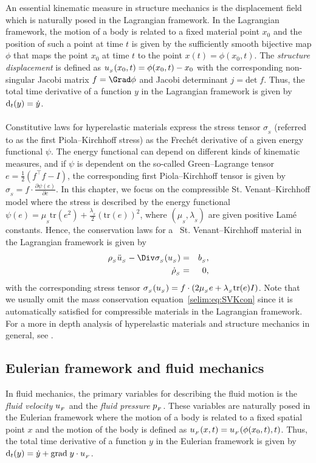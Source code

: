 An essential kinematic measure in structure mechanics is the
displacement field which is naturally posed in the Lagrangian
framework.  In the Lagrangian framework, the motion of a body is
related to a fixed material point $x_0$ and the position of
such a point at time $t$ is given by the sufficiently smooth bijective
map $\phi$ that maps the point $x_0$ at time $t$ to the point $x(t)=
\phi(x_0,t)$. The \emph{structure displacement} is defined as
$u_{_{S}}(x_0,t) = \phi(x_0, t) - x_0$ with the corresponding non-singular
Jacobi matrix $f = \Grad\phi$ and Jacobi determinant $j =
\textrm{det}\; f$. Thus, the total time derivative of a function $y$
in the Lagrangian framework is given by $\textrm{d}_t(y) = \dot{y}$.
\\\\
Constitutive laws for hyperelastic materials express the stress
tensor $\sigma_{_{S}}$ (referred to as the first Piola--Kirchhoff
stress) as the Frech\'{e}t derivative of a given energy functional
$\psi$.  The energy functional can depend on different kinds of
kinematic measures, and if $\psi$ is dependent on the so-called
Green--Lagrange tensor $e= \tfrac{1}{2}(f^{\top}f -I)$, the corresponding first
Piola--Kirchhoff tensor is given by $\sigma_{_{S}} =
f\cdot\frac{\partial \psi(e)}{\partial e}$. In this chapter, we focus
on the compressible St. Venant--Kirchhoff model where the stress is
described by the energy functional $\psi(e) =
\mu_{_{S}}\textrm{tr}(e^2) +
\frac{\lambda_{_{S}}}{2}(\textrm{tr}(e))^2$, where
$(\mu_{_{S}},\lambda_{_{S}})$ are given positive Lam\'{e}
constants. Hence, the conservation laws for a ~St. Venant--Kirchhoff
material in the Lagrangian framework is given by
\begin{eqnarray}
\label{selim:eq:SVKmom}
\rhoS \ddotuS - \Div\sigmaS(\uS) &=& b_{_{S}}, \\
\label{selim:eq:SVKcon}
\dot{\rho}_{_{S}}&=&0,
\end{eqnarray}
with the corresponding stress tensor $\sigma_{_{S}}(u_{_{S}}) =
f\cdot(2\mu_{_{S}}e + \lambda_{_{S}} \textrm{tr}(e)I)$.  Note that we
usually omit the mass conservation equation~\eqref{selim:eq:SVKcon}
since it is automatically satisfied for compressible materials in the
Lagrangian framework.  For a more in depth analysis of hyperelastic
materials and structure mechanics in general, see \citet{Gurtin1981,
  Holzapfel2000, Narayanan2007}.

\subsection{Eulerian framework and fluid mechanics}
\label{selim:sec:fluid}
In fluid mechanics, the primary variables for describing the fluid
motion is the \emph{fluid velocity} $u_{_{F}}$ and the \emph{fluid
  pressure} $p_{_{F}}$. These variables are naturally posed in the Eulerian
framework where the motion of a body is related to a fixed spatial
point $x$ and the motion of the body is defined as $u_{_{F}}(x,t) =
u_{_{F}}(\phi(x_0,t),t)$. Thus, the total time derivative of a function $y$
in the Eulerian framework is given by $\textrm{d}_t(y) = \dot{y} +
\textrm{grad}\;y\cdot u_{_{F}}$.

